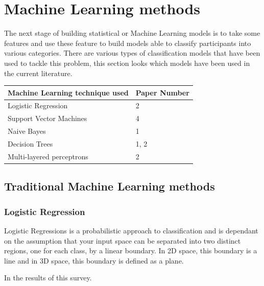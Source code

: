 \documentclass[10pt, letterpaper, twoside, openany]{thesis}
\begin{document}
\section{Machine Learning methods}
The next stage of building statistical or Machine Learning models is to take some features and use these feature to build models able to classify participants into various categories. There are various types of classification models that have been used to tackle this problem, this section looks which models have been used in the current literature.

\begin{table}[H]
	\begin{center}
	\begin{tabular}{ p{6cm} | p{6cm} }
	\hline
	Machine Learning technique used & Paper Number \\ \hline
	Logistic Regression & 2 \\ \hline
	Support Vector Machines & 4 \\ \hline
	Naive Bayes & 1 \\ \hline
	Decision Trees & 1, 2 \\ \hline
	Multi-layered perceptrons & 2 \\ \hline
	\hline 
	\end{tabular}
	\end{center}
\end{table}

\subsection{Traditional Machine Learning methods}
\subsubsection{Logistic Regression}
Logistic Regressions is a probabilistic approach to classification and is dependant on the assumption that your input space can be separated into two distinct regions, one for each class, by a linear boundary. In 2D space, this boundary is a line and in 3D space, this boundary is defined as a plane. 
\par 
In the results of this survey.
\end{document}
